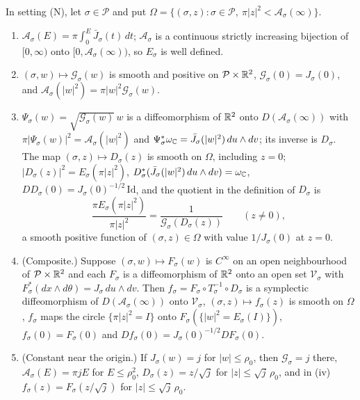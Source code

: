 \begin{lemma}\label{lem:pln-area}
In setting (N), let $\sigma\in\mathcal P$ and put $\Omega=\{(\sigma,z):\sigma\in\mathcal P,\ \pi|z|^2<\mathcal A_\sigma(\infty)\}$.
\begin{enumerate}[label=(\roman*)]
\item $\mathcal A_\sigma(E)=\pi\int_0^E\bar J_\sigma(t)\,dt$; $\mathcal A_\sigma$ is a continuous strictly increasing
 bijection of $[0,\infty)$ onto $[0,\mathcal A_\sigma(\infty))$, so $E_\sigma$ is well defined.
\item $(\sigma,w)\mapsto\mathcal G_\sigma(w)$ is smooth and positive on $\mathcal P\times\mathbb{R}^2$, $\mathcal G_\sigma(0)=J_\sigma(0)$, and
 $\mathcal A_\sigma(|w|^2)=\pi|w|^2\mathcal G_\sigma(w)$.
\item $\Psi_\sigma(w)=\sqrt{\mathcal G_\sigma(w)}\,w$ is a diffeomorphism of $\mathbb{R}^2$ onto $D(\mathcal A_\sigma(\infty))$ with
 $\pi|\Psi_\sigma(w)|^2=\mathcal A_\sigma(|w|^2)$ and $\Psi_\sigma^*\omega_{\mathbb{C}}=\bar J_\sigma(|w|^2)\,du\wedge dv$; its
 inverse is $D_\sigma$. The map $(\sigma,z)\mapsto D_\sigma(z)$ is smooth on $\Omega$, including $z=0$;
 $|D_\sigma(z)|^2=E_\sigma(\pi|z|^2)$, $D_\sigma^*(\bar J_\sigma(|w|^2)\,du\wedge dv)=\omega_{\mathbb{C}}$,
 $DD_\sigma(0)=J_\sigma(0)^{-1/2}\,\mathrm{Id}$, and the quotient in the definition of $D_\sigma$ is
 \[
  \frac{\pi E_\sigma(\pi|z|^2)}{\pi|z|^2}=\frac1{\mathcal G_\sigma(D_\sigma(z))}\qquad(z\ne0),
 \]
 a smooth positive function of $(\sigma,z)\in\Omega$ with value $1/J_\sigma(0)$ at $z=0$.
\item (Composite.) Suppose $(\sigma,w)\mapsto F_\sigma(w)$ is $C^\infty$ on an open neighbourhood of
 $\mathcal P\times\mathbb{R}^2$ and each $F_\sigma$ is a diffeomorphism of $\mathbb{R}^2$ onto an open set $\mathcal V_\sigma$ with
 $F_\sigma^*(dx\wedge d\theta)=J_\sigma\,du\wedge dv$. Then $f_\sigma=F_\sigma\circ T_\sigma^{-1}\circ D_\sigma$ is a
 symplectic diffeomorphism of $D(\mathcal A_\sigma(\infty))$ onto $\mathcal V_\sigma$, $(\sigma,z)\mapsto f_\sigma(z)$ is smooth on
 $\Omega$, $f_\sigma$ maps the circle $\{\pi|z|^2=I\}$ onto $F_\sigma(\{|w|^2=E_\sigma(I)\})$, $f_\sigma(0)=F_\sigma(0)$ and
 $Df_\sigma(0)=J_\sigma(0)^{-1/2}DF_\sigma(0)$.
\item (Constant near the origin.) If $J_\sigma(w)=j$ for $|w|\le\rho_0$, then $\mathcal G_\sigma=j$ there,
 $\mathcal A_\sigma(E)=\pi jE$ for $E\le\rho_0^2$, $D_\sigma(z)=z/\sqrt j$ for $|z|\le\sqrt j\,\rho_0$, and in (iv)
 $f_\sigma(z)=F_\sigma(z/\sqrt j)$ for $|z|\le\sqrt j\,\rho_0$.
\end{enumerate}
\end{lemma}

